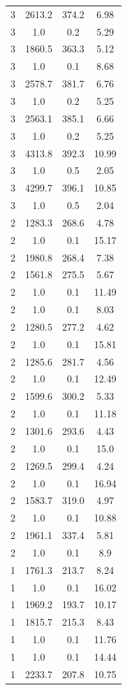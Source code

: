 \begin{table}[htbp]
\begin{tabular}{c c c c}
3 & 2613.2 & 374.2 & 6.98 \\
3 & 1.0 & 0.2 & 5.29 \\
3 & 1860.5 & 363.3 & 5.12 \\
3 & 1.0 & 0.1 & 8.68 \\
3 & 2578.7 & 381.7 & 6.76 \\
3 & 1.0 & 0.2 & 5.25 \\
3 & 2563.1 & 385.1 & 6.66 \\
3 & 1.0 & 0.2 & 5.25 \\
3 & 4313.8 & 392.3 & 10.99 \\
3 & 1.0 & 0.5 & 2.05 \\
3 & 4299.7 & 396.1 & 10.85 \\
3 & 1.0 & 0.5 & 2.04 \\
2 & 1283.3 & 268.6 & 4.78 \\
2 & 1.0 & 0.1 & 15.17 \\
2 & 1980.8 & 268.4 & 7.38 \\
2 & 1561.8 & 275.5 & 5.67 \\
2 & 1.0 & 0.1 & 11.49 \\
2 & 1.0 & 0.1 & 8.03 \\
2 & 1280.5 & 277.2 & 4.62 \\
2 & 1.0 & 0.1 & 15.81 \\
2 & 1285.6 & 281.7 & 4.56 \\
2 & 1.0 & 0.1 & 12.49 \\
2 & 1599.6 & 300.2 & 5.33 \\
2 & 1.0 & 0.1 & 11.18 \\
2 & 1301.6 & 293.6 & 4.43 \\
2 & 1.0 & 0.1 & 15.0 \\
2 & 1269.5 & 299.4 & 4.24 \\
2 & 1.0 & 0.1 & 16.94 \\
2 & 1583.7 & 319.0 & 4.97 \\
2 & 1.0 & 0.1 & 10.88 \\
2 & 1961.1 & 337.4 & 5.81 \\
2 & 1.0 & 0.1 & 8.9 \\
1 & 1761.3 & 213.7 & 8.24 \\
1 & 1.0 & 0.1 & 16.02 \\
1 & 1969.2 & 193.7 & 10.17 \\
1 & 1815.7 & 215.3 & 8.43 \\
1 & 1.0 & 0.1 & 11.76 \\
1 & 1.0 & 0.1 & 14.44 \\
1 & 2233.7 & 207.8 & 10.75 \\

\end{tabular}
\end{table}
